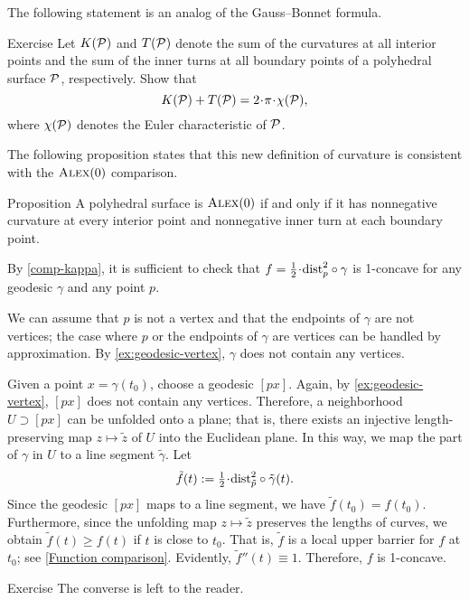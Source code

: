 The following statement is an analog of the Gauss--Bonnet formula.

\begin{thm}{Exercise}\label{ex:gauss-bonnet}
Let $K(\mathcal{P})$ and $T(\mathcal{P})$ denote the sum of the curvatures at all interior points
and the sum of the inner turns at all boundary points of a polyhedral surface $\mathcal{P}$, respectively.
Show that
\[
K(\spc{P}) + T(\spc{P}) = 2 \cdot \pi \cdot \chi(\spc{P}),
\]
where $\chi(\mathcal{P})$ denotes the Euler characteristic of $\mathcal{P}$.
\end{thm}

The following proposition states that this new definition of curvature is consistent with the $\textsc{Alex}(0)$ comparison.

\begin{thm}{Proposition}\label{prop:poly-CBB}
A polyhedral surface is $\textsc{Alex}(0)$ if and only if it has nonnegative curvature at every interior point and nonnegative inner turn at each boundary point.
\end{thm}

By \ref{comp-kappa}, it is sufficient to check that
$f=\tfrac12\cdot\distfun_p^2\circ\gamma$ is 1-concave for any geodesic $\gamma$ and any point $p$.

We can assume that $p$ is not a vertex and that the endpoints of $\gamma$ are not vertices;
the case where $p$ or the endpoints of $\gamma$ are vertices can be handled by approximation.
By \ref{ex:geodesic-vertex}, $\gamma$ does not contain any vertices.



Given a point $x=\gamma(t_0)$, choose a geodesic $[px]$.
Again, by \ref{ex:geodesic-vertex}, $[px]$ does not contain any vertices.
Therefore, a neighborhood $U \supset [px]$ can be unfolded onto a plane;
that is, there exists an injective length-preserving map $z \mapsto \tilde z$
of $U$ into the Euclidean plane.
In this way, we map the part of $\gamma$ in $U$ to a line segment $\tilde \gamma$.
Let
\[\tilde f(t) \df \tfrac12 \cdot \distfun_{\tilde p}^2 \circ \tilde \gamma(t).\]
Since the geodesic $[px]$ maps to a line segment, we have $\tilde f(t_0) = f(t_0)$.
Furthermore, since the unfolding map $z \mapsto \tilde z$ preserves the lengths of curves, we obtain
$\tilde f(t) \ge f(t)$ if $t$ is close to $t_0$.
That is, $\tilde f$ is a local upper barrier for $f$ at $t_0$; see \ref{Function comparison}.
Evidently, $\tilde f''(t) \equiv 1$.
Therefore, $f$ is 1-concave.

\begin{thm}{Exercise}\label{ex:poly-CBB}
The converse is left to the reader.\qeds
\end{thm}










